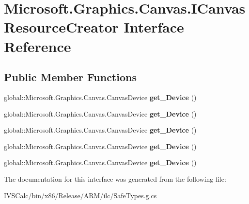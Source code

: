 \hypertarget{interface_microsoft_1_1_graphics_1_1_canvas_1_1_i_canvas_resource_creator}{}\section{Microsoft.\+Graphics.\+Canvas.\+I\+Canvas\+Resource\+Creator Interface Reference}
\label{interface_microsoft_1_1_graphics_1_1_canvas_1_1_i_canvas_resource_creator}
\subsection*{Public Member Functions}
\begin{DoxyCompactItemize}
\item 
\mbox{\label{interface_microsoft_1_1_graphics_1_1_canvas_1_1_i_canvas_resource_creator_a0d7528db0c6ce8f4a52003efa684be1f}} 
global\+::\+Microsoft.\+Graphics.\+Canvas.\+Canvas\+Device {\bfseries get\+\_\+\+Device} ()
\item 
\mbox{\label{interface_microsoft_1_1_graphics_1_1_canvas_1_1_i_canvas_resource_creator_a0d7528db0c6ce8f4a52003efa684be1f}} 
global\+::\+Microsoft.\+Graphics.\+Canvas.\+Canvas\+Device {\bfseries get\+\_\+\+Device} ()
\item 
\mbox{\label{interface_microsoft_1_1_graphics_1_1_canvas_1_1_i_canvas_resource_creator_a0d7528db0c6ce8f4a52003efa684be1f}} 
global\+::\+Microsoft.\+Graphics.\+Canvas.\+Canvas\+Device {\bfseries get\+\_\+\+Device} ()
\item 
\mbox{\label{interface_microsoft_1_1_graphics_1_1_canvas_1_1_i_canvas_resource_creator_a0d7528db0c6ce8f4a52003efa684be1f}} 
global\+::\+Microsoft.\+Graphics.\+Canvas.\+Canvas\+Device {\bfseries get\+\_\+\+Device} ()
\item 
\mbox{\label{interface_microsoft_1_1_graphics_1_1_canvas_1_1_i_canvas_resource_creator_a0d7528db0c6ce8f4a52003efa684be1f}} 
global\+::\+Microsoft.\+Graphics.\+Canvas.\+Canvas\+Device {\bfseries get\+\_\+\+Device} ()
\end{DoxyCompactItemize}


The documentation for this interface was generated from the following file\+:\begin{DoxyCompactItemize}
\item 
I\+V\+S\+Calc/bin/x86/\+Release/\+A\+R\+M/ilc/Safe\+Types.\+g.\+cs\end{DoxyCompactItemize}
